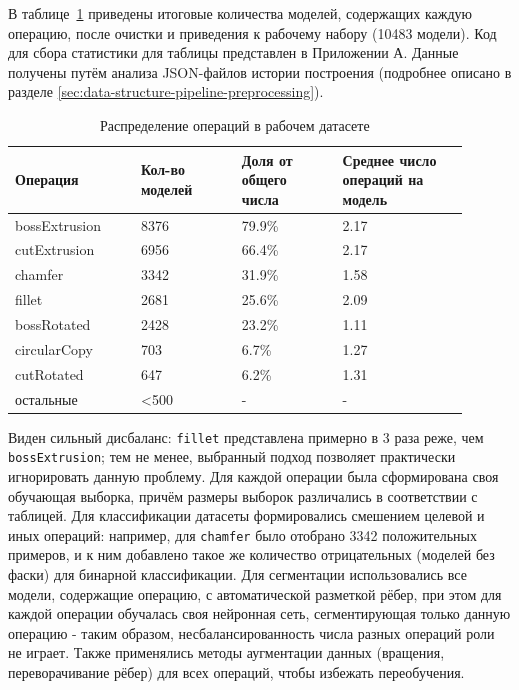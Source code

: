 В таблице~\ref{tab:ops-stats-filter} приведены итоговые количества моделей, содержащих каждую операцию, после очистки и приведения к рабочему набору (10483 модели). Код для сбора статистики для таблицы представлен в Приложении А. Данные получены путём анализа JSON-файлов истории построения (подробнее описано в разделе \ref{sec:data-structure-pipeline-preprocessing}).

\begin{table}[h]
\centering
\begin{tabular}{|p{0.25\linewidth}|p{0.2\linewidth}|p{0.2\linewidth}|p{0.25\linewidth}|}
\hline
\textbf{Операция} & \textbf{Кол-во моделей} & \textbf{Доля от общего числа} & \textbf{Среднее число операций на модель} \\
\hline
bossExtrusion & 8376 & 79.9\% & 2.17 \\
cutExtrusion & 6956 & 66.4\% & 2.17 \\
chamfer & 3342 & 31.9\% & 1.58 \\
fillet & 2681 & 25.6\% & 2.09 \\
bossRotated & 2428 & 23.2\% & 1.11 \\
circularCopy & 703 & 6.7\% & 1.27 \\
cutRotated & 647 & 6.2\% & 1.31 \\
остальные & <500 & - & - \\
\hline
\end{tabular}
\caption{Распределение операций в рабочем датасете}
\label{tab:ops-stats-filter}
\end{table}

Виден сильный дисбаланс: \texttt{fillet} представлена примерно в 3 раза реже, чем \texttt{bossExtrusion}; тем не менее, выбранный подход позволяет практически игнорировать данную проблему. Для каждой операции была сформирована своя обучающая выборка, причём размеры выборок различались в соответствии с таблицей. Для классификации датасеты формировались смешением целевой и иных операций: например, для \texttt{chamfer} было отобрано 3342 положительных примеров, и к ним добавлено такое же количество отрицательных (моделей без фаски) для бинарной классификации. Для сегментации использовались все модели, содержащие операцию, с автоматической разметкой рёбер, при этом для каждой операции обучалась своя нейронная сеть, сегментирующая только данную операцию - таким образом, несбалансированность числа разных операций роли не играет. Также применялись методы аугментации данных (вращения, переворачивание рёбер) для всех операций, чтобы избежать переобучения.
